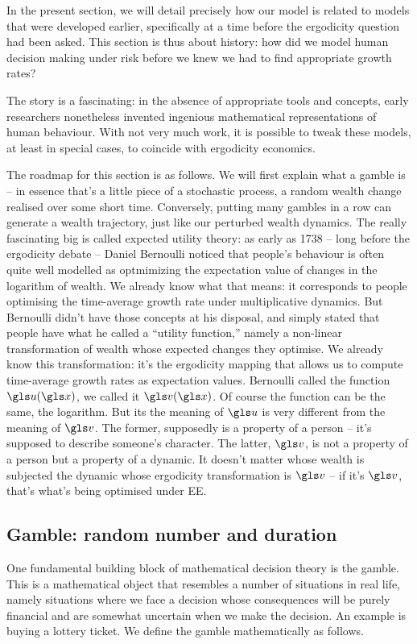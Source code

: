 In the present section, we will detail precisely how our model is related to models that were developed earlier, 
specifically at a time before the ergodicity question had been asked. This section is thus about history: how did we
model human decision making under risk before we knew we had to find appropriate growth rates?

The story is a fascinating: in the absence of appropriate tools and concepts, early researchers nonetheless
invented ingenious mathematical representations of human behaviour. With not very much work, it is possible to tweak
these models, at least in special cases, to coincide with ergodicity economics.

The roadmap for this section is as follows. We will first explain what a gamble is -- in essence that's a little piece of a stochastic process, a random wealth change realised over some short time.
Conversely, putting many gambles in a row can generate a wealth trajectory, just like our perturbed wealth dynamics.
The really fascinating big is called expected utility theory: as early as 1738 -- long before the ergodicity debate -- Daniel Bernoulli noticed that people's behaviour is often quite well modelled as optmimizing the expectation value of changes in the logarithm of wealth. We already know what that means: it corresponds to people optimising the time-average growth rate under multiplicative dynamics. But Bernoulli didn't have those concepts at his disposal, and simply stated that people have what he called a ``utility function,'' namely a non-linear transformation of wealth whose expected changes they optimise.
We already know this transformation: it's the ergodicity mapping that allows us to compute time-average growth rates as expectation values. Bernoulli called the function $\gu(\x)$, we called it $\gv(\x)$. Of course the function can be the same, \eg the logarithm. But its the meaning of $\gu$ is very different from the meaning of $\gv$. The former, supposedly is a property of a person -- it's supposed to describe someone's character. The latter, $\gv$, is not a property of a person but a property of a dynamic. It doesn't matter whose wealth is subjected the dynamic whose ergodicity transformation is $\gv$ -- if it's $\gv$, that's what's being optimised under EE.

\subsection{Gamble: random number and duration}
One fundamental building block of mathematical decision theory is the gamble.
This is a mathematical object that resembles a number of situations in real life, 
namely situations where we face a decision whose consequences will be purely
financial and are somewhat uncertain when we make the decision. An 
example is buying a lottery ticket. We define the gamble mathematically as follows.

